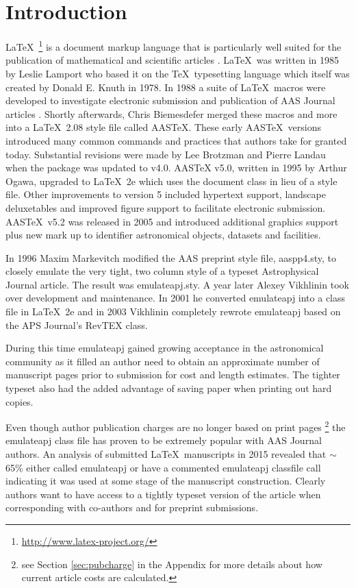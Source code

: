 \documentclass{aastex63}
\newcommand\aastex{AAS\TeX}
\newcommand\latex{La\TeX}
\begin{document}
\section{Introduction} \label{sec:intro}

\latex\ \footnote{\url{http://www.latex-project.org/}} is a document markup
language that is particularly well suited for the publication of
mathematical and scientific articles \citep{lamport94}. \latex\ was written
in 1985 by Leslie Lamport who based it on the \TeX\ typesetting language
which itself was created by Donald E. Knuth in 1978.  In 1988 a suite of
\latex\ macros were developed to investigate electronic submission and
publication of AAS Journal articles \citep{1989BAAS...21..780H}.  Shortly
afterwards, Chris Biemesdefer merged these macros and more into a \latex\
2.08 style file called \aastex.  These early \aastex\ versions introduced
many common commands and practices that authors take for granted today.
Substantial revisions
were made by Lee Brotzman and Pierre Landau when the package was updated to
v4.0.  AASTeX v5.0, written in 1995 by Arthur Ogawa, upgraded to \latex\ 2e
which uses the document class in lieu of a style file.  Other improvements
to version 5 included hypertext support, landscape deluxetables and
improved figure support to facilitate electronic submission.  
\aastex\ v5.2 was released in 2005 and introduced additional graphics
support plus new mark up to identifier astronomical objects, datasets and
facilities.

In 1996 Maxim Markevitch modified the AAS preprint style file, aaspp4.sty,
to closely emulate the very tight, two column style of a typeset
Astrophysical Journal article.  The result was emulateapj.sty.  A year
later Alexey Vikhlinin took over development and maintenance.  In 2001 he
converted emulateapj into a class file in \latex\ 2e and in 2003 Vikhlinin
completely rewrote emulateapj based on the APS Journal's RevTEX class.

During this time emulateapj gained growing acceptance in the astronomical
community as it filled an author need to obtain an approximate number of
manuscript pages prior to submission for cost and length estimates. The
tighter typeset also had the added advantage of saving paper when printing
out hard copies.

Even though author publication charges are no longer based on print pages
\footnote{see Section \ref{sec:pubcharge} in the Appendix for more details
about how current article costs are calculated.} the emulateapj class file
has proven to be extremely popular with AAS Journal authors.  An 
analysis of submitted \latex\ manuscripts in 2015 revealed that $\sim$65\%
either called emulateapj or have a commented emulateapj classfile call
indicating it was used at some stage of the manuscript construction.
Clearly authors want to have access to a tightly typeset version of the
article when corresponding with co-authors and for preprint submissions.
\end{document}

